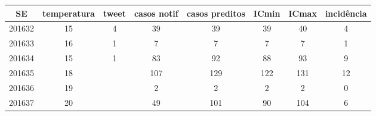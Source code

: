 \begin{tabular}{c|ccccccc}
  \hline
SE & temperatura & tweet & casos notif & casos preditos & ICmin & ICmax & incidência \\ 
  \hline
201632 & 15 & 4 & 39 & 39 & 39 & 40 & 4 \\ 
  201633 & 16 & 1 & 7 & 7 & 7 & 7 & 1 \\ 
  201634 & 15 & 1 & 83 & 92 & 88 & 93 & 9 \\ 
  201635 & 18 &  & 107 & 129 & 122 & 131 & 12 \\ 
  201636 & 19 &  & 2 & 2 & 2 & 2 & 0 \\ 
  201637 & 20 &  & 49 & 101 & 90 & 104 & 6 \\ 
   \hline
\end{tabular}
